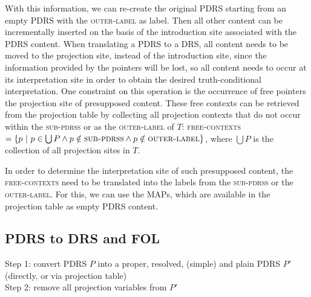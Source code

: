 With this information, we can re-create the original PDRS starting from an
empty PDRS with the \textsc{outer-label} as label. Then all other content
can be incrementally inserted on the basis of the introduction site
associated with the PDRS content. When translating a PDRS to a DRS, all
content needs to be moved to the projection site, instead of the
introduction site, since the information provided by the pointers will be
lost, so all content needs to occur at its interpretation site in order to
obtain the desired truth-conditional interpretation. One constraint on this
operation is the occurrence of free pointers the projection site of
presupposed content. These free contexts can be retrieved from the
projection table by collecting all projection contexts that do not occur
within the \textsc{sub-pdrss} or as the \textsc{outer-label} of $T$:
\textsc{free-contexts} $=\{p~|~p\in\bigcup P \wedge p \notin
\textsc{sub-pdrss} \wedge p \notin \textsc{outer-label}\}$, where $\bigcup
P$ is the collection of all projection sites in $T$.

In order to determine the interpretation site of such presupposed content,
the \textsc{free-contexts} need to be translated into the labels from the
\textsc{sub-pdrss} or the \textsc{outer-label}. For this, we can use the
MAPs, which are available in the projection table as empty PDRS content.

\subsection{PDRS to DRS and FOL}

Step 1: convert PDRS $P$ into a proper, resolved, (simple) and plain PDRS $P'$
(directly, or via projection table)\\

\noindent Step 2: remove all projection variables from $P'$


